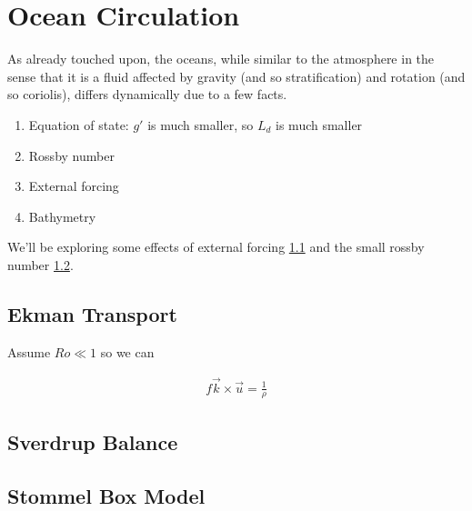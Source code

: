 \chapter{Ocean Circulation}

As already touched upon, the oceans, while similar to the atmosphere in the sense that it is a fluid affected by gravity (and so stratification) and rotation (and so coriolis), differs dynamically due to a few facts.

\begin{enumerate}
    \item Equation of state: $g'$ is much smaller, so $L_d$ is much smaller
    \item Rossby number
    \item External forcing
    \item Bathymetry
\end{enumerate}

We'll be exploring some effects of external forcing \ref{Ekman Transport} and the small rossby number \ref{Sverdrup Balance}.

\section{Ekman Transport}\label{Ekman Transport}

Assume $Ro\ll1$ so we can 

\begin{align}
    f\vec{k}\times\vec{u}=\frac{1}{\rho}
\end{align}

\section{Sverdrup Balance}\label{Sverdrup Balance}

\section{Stommel Box Model}\label{MOC}